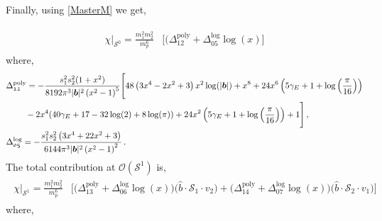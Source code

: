 Finally, using \eqref{MasterM} we get,

\begin{align}
    \begin{split} \label{eqt7b}
        \chi\Big|_{\mathcal{S}^0}=\frac{m_1^2m_2^2}{m_p^6}&\Bigg[\Big(\Delta_{\mathfrak{12}}^{\textrm{poly}}+\Delta_{\mathfrak{05}}^{\textrm{log}}\log (x)\Bigg] 
        \end{split}
\end{align}
where, 
\begin{align}
    \begin{split}
   & \Delta_{\mathfrak{12}}^{\textrm{poly}}=-\frac{s_1^2s_2^2 (1+x^2)}{8192 \pi ^3 |\boldsymbol{b}|^2 \left(x^2-1\right)^5}\Bigg[48 \left(3 x^4-2 x^2+3\right) x^2 \log (|\boldsymbol{b}|)+x^8+24 x^6 \left(5 \gamma_E +1+\log \left(\frac{\pi }{16}\right)\right)\\&\hspace{0.8cm}-2 x^4 (40 \gamma_E +17-32 \log (2)+8 \log (\pi ))+24 x^2 \left(5 \gamma_E +1+\log \left(\frac{\pi }{16}\right)\right)+1\Bigg]\,,\\&
   \Delta_{\mathfrak{05}}^{\textrm{log}}=-\frac{ s_1^2 s_2^2 \left(3 x^4+22 x^2+3\right)}{6144 \pi ^3 |\boldsymbol{b}|^2 \left(x^2-1\right)^2 }\,.
      \end{split}
\end{align}
The total contribution at $\mathcal{O}(\mathcal{S}^1)$ is, 
\begin{align}
\begin{split} \label{eqt8}
\chi\Big|_{\mathcal{S}^1} =\frac{m_1^2m_2^2}{m_p^6}&\Bigg[\Big(\Delta_{\mathfrak{13}}^{\textrm{poly}}+\Delta_{\mathfrak{06}}^{\textrm{log}}\log (x)\Big)\Big(\hat{b}\cdot \mathcal{S}_1\cdot v_2\Big)+\Big(\Delta_{\mathfrak{14}}^{\textrm{poly}}+\Delta_{\mathfrak{07}}^{\textrm{log}}\log (x)\Big)\Big(\hat{b}\cdot \mathcal{S}_2\cdot v_1\Big)\Bigg]
\end{split}
\end{align}
where,
